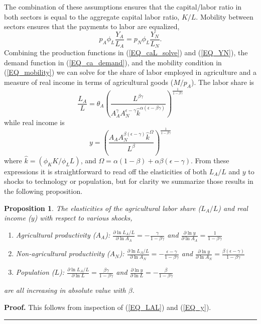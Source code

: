 \documentclass[11pt]{article}
\newtheorem{proposition}{Proposition}
\newenvironment{proof}[1][Proof]{\noindent\textbf{#1.} }{\ \rule{0.5em}{0.5em}}
\begin{document}
The combination of these assumptions ensures that the capital/labor ratio in both sectors is equal to the aggregate capital labor ratio, $K/L$. Mobility between sectors ensures that the payments to labor are equalized,
\begin{equation}
    p_A \phi_L \frac{Y_A}{L_A} = p_N \phi_L \frac{Y_N}{L_N}. \label{EQ_mobility}
\end{equation}
Combining the production functions in (\ref{EQ_caL_solve}) and (\ref{EQ_YN}), the demand function in (\ref{EQ_ca_demand}), and the mobility condition in (\ref{EQ_mobility}) we can solve for the share of labor employed in agriculture and a measure of real income in terms of agricultural goods ($M/p_A$). The labor share is
\begin{equation}
	\frac{L_A}{L} = \theta_A \left(\frac{L^{\beta\gamma}}{A_A^{\gamma} A_N^{\epsilon - \gamma} \hat{k}^{\alpha(\epsilon - \beta\gamma)}}\right)^{\frac{1}{1-\beta\gamma}} \label{EQ_LAL}
\end{equation}
while real income is
\begin{equation}
	y = \left(\frac{A_A A_N^{\beta(\epsilon-\gamma)}\hat{k}^{\Omega}}{L^{\beta}} \right)^{\frac{1}{1-\beta\gamma}} \label{EQ_y}
\end{equation}
where $\hat{k} = (\phi_K K/\phi_L L)$, and $\Omega = \alpha(1-\beta) + \alpha\beta(\epsilon-\gamma)$. From these expressions it is straightforward to read off the elasticities of both $L_A/L$ and $y$ to shocks to technology or population, but for clarity we summarize those results in the following proposition. 

\begin{proposition}
The elasticities of the agricultural labor share ($L_A/L$) and real income ($y$) with respect to various shocks,
\begin{enumerate}
	\item[(a)] Agricultural productivity ($A_A$): $\frac{\partial \ln L_A/L}{\partial \ln A_A} = - \frac{\gamma}{1-\beta\gamma}$ and $\frac{\partial \ln y}{\partial \ln A_A} = \frac{1}{1-\beta\gamma}$
	\item[(b)] Non-agricultural productivity ($A_N$): $\frac{\partial \ln L_A/L}{\partial \ln A_N} = - \frac{\epsilon-\gamma}{1-\beta\gamma}$ and $\frac{\partial \ln y}{\partial \ln A_N} = \frac{\beta(\epsilon-\gamma)}{1-\beta\gamma}$
	\item[(c)] Population ($L$): $\frac{\partial \ln L_A/L}{\partial \ln L} = \frac{\beta\gamma}{1-\beta\gamma}$ and $\frac{\partial \ln y}{\partial \ln L} = - \frac{\beta}{1-\beta\gamma}$
\end{enumerate}
are all increasing in absolute value with $\beta$.
\end{proposition}
\begin{proof}
This follows from inspection of (\ref{EQ_LAL}) and (\ref{EQ_y}).
\end{proof}
\end{document}
